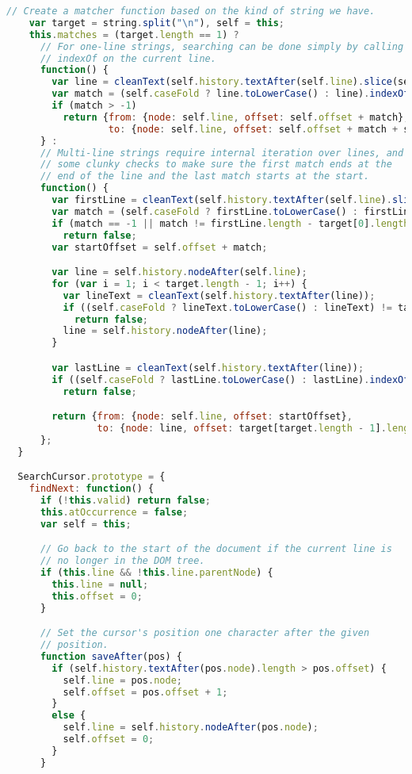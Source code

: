 \begin{lstlisting}[language=Javascript]
    // Create a matcher function based on the kind of string we have.
    var target = string.split("\n"), self = this;
    this.matches = (target.length == 1) ?
      // For one-line strings, searching can be done simply by calling
      // indexOf on the current line.
      function() {
        var line = cleanText(self.history.textAfter(self.line).slice(self.offset));
        var match = (self.caseFold ? line.toLowerCase() : line).indexOf(string);
        if (match > -1)
          return {from: {node: self.line, offset: self.offset + match},
                  to: {node: self.line, offset: self.offset + match + string.length}};
      } :
      // Multi-line strings require internal iteration over lines, and
      // some clunky checks to make sure the first match ends at the
      // end of the line and the last match starts at the start.
      function() {
        var firstLine = cleanText(self.history.textAfter(self.line).slice(self.offset));
        var match = (self.caseFold ? firstLine.toLowerCase() : firstLine).lastIndexOf(target[0]);
        if (match == -1 || match != firstLine.length - target[0].length)
          return false;
        var startOffset = self.offset + match;

        var line = self.history.nodeAfter(self.line);
        for (var i = 1; i < target.length - 1; i++) {
          var lineText = cleanText(self.history.textAfter(line));
          if ((self.caseFold ? lineText.toLowerCase() : lineText) != target[i])
            return false;
          line = self.history.nodeAfter(line);
        }

        var lastLine = cleanText(self.history.textAfter(line));
        if ((self.caseFold ? lastLine.toLowerCase() : lastLine).indexOf(target[target.length - 1]) != 0)
          return false;

        return {from: {node: self.line, offset: startOffset},
                to: {node: line, offset: target[target.length - 1].length}};
      };
  }

  SearchCursor.prototype = {
    findNext: function() {
      if (!this.valid) return false;
      this.atOccurrence = false;
      var self = this;

      // Go back to the start of the document if the current line is
      // no longer in the DOM tree.
      if (this.line && !this.line.parentNode) {
        this.line = null;
        this.offset = 0;
      }

      // Set the cursor's position one character after the given
      // position.
      function saveAfter(pos) {
        if (self.history.textAfter(pos.node).length > pos.offset) {
          self.line = pos.node;
          self.offset = pos.offset + 1;
        }
        else {
          self.line = self.history.nodeAfter(pos.node);
          self.offset = 0;
        }
      }


\end{lstlisting}
